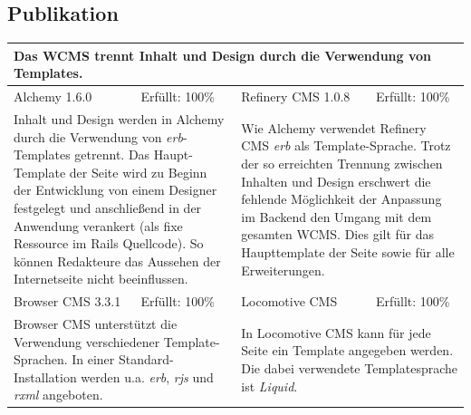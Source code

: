 \subsection{Publikation}
\begin{tabular}[!ht]{|l|l|l|l|}
\hline
\multicolumn{4}{|p{15cm}|}{\textbf{Das WCMS trennt Inhalt und Design durch die Verwendung von Templates.}} \\
\hline
  Alchemy 1.6.0 & \cellcolor{green}Erfüllt: 100\% & Refinery CMS 1.0.8 & \cellcolor{green}Erfüllt: 100\% \\
  \hline
  \multicolumn{2}{|p{7.5cm}|}{Inhalt und Design werden in Alchemy durch die Verwendung von \emph{erb}-Templates getrennt. Das Haupt-Template der Seite wird zu Beginn der Entwicklung von einem Designer festgelegt und anschließend in der Anwendung verankert (als fixe Ressource im Rails Quellcode). So können Redakteure das Aussehen der Internetseite nicht beeinflussen.} & \multicolumn{2}{p{7.5cm}|}{Wie Alchemy verwendet Refinery CMS \emph{erb} als Template-Sprache.
Trotz der so erreichten Trennung zwischen Inhalten und Design erschwert die fehlende Möglichkeit der Anpassung im Backend den Umgang mit dem gesamten WCMS. Dies gilt für das Haupttemplate der Seite sowie für alle Erweiterungen.} \\
  \hline
  Browser CMS 3.3.1 & \cellcolor{green}Erfüllt: 100\% & Locomotive CMS & \cellcolor{green}Erfüllt: 100\% \\
  \hline
  \multicolumn{2}{|p{7.5cm}|}{Browser CMS unterstützt die Verwendung verschiedener Template-Sprachen.
In einer Standard-Installation werden u.a. \emph{erb}, \emph{rjs} und \emph{rxml} angeboten.} & \multicolumn{2}{p{7.5cm}|}{In Locomotive CMS kann für jede Seite ein Template angegeben werden. Die dabei verwendete Templatesprache ist \emph{Liquid}.} \\
\hline
\end{tabular}
\newline
\newline
\newline
